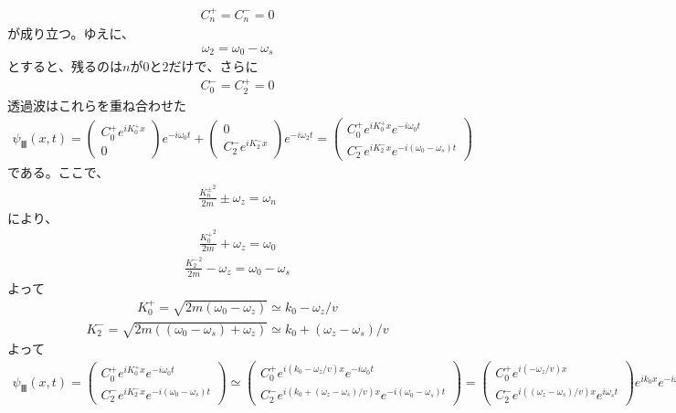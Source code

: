 \begin{align}
C_{n}^{+}=C_{n}^{-}=0
\end{align}
が成り立つ。ゆえに、
\begin{align}
\omega_{2}=\omega_{0}-\omega_{s}
\end{align}
$とすると、残るのはnが0と2だけで、さらに$
\begin{align}
C_{0}^{-}=C_{2}^{+}=0
\end{align}
透過波はこれらを重ね合わせた
\begin{align}
{\psi}_{Ⅲ}(x,t)=
\begin{pmatrix}
C_{0}^{+}e^{iK_{0}^{+}x} \\
0
\end{pmatrix}
e^{-i\omega_{0}t}+
\begin{pmatrix}
0 \\
C_{2}^{-}e^{iK_{2}^{-}x}
\end{pmatrix}
e^{-i\omega_{2}t}
=\begin{pmatrix}
C_{0}^{+}e^{iK_{0}^{+}x}e^{-i\omega_{0}t} \\
C_{2}^{-}e^{iK_{2}^{-}x}e^{-i(\omega_{0}-\omega_{s})t}
\end{pmatrix}
\end{align}
である。ここで、
\begin{align}
\frac{{K_{n}^{\pm}}^2}{2m}{\pm}\omega_{z}=\omega_{n}
\end{align}
により、
\begin{align}
\frac{{K_{0}^{+}}^2}{2m}+\omega_{z}=\omega_{0}
\end{align}
\begin{align}
\frac{{K_{2}^{-}}^2}{2m}-\omega_{z}=\omega_{0}-\omega_{s}
\end{align}
よって
\begin{align}
K_{0}^{+}=\sqrt{2m(\omega_{0}-\omega_{z})}{\simeq}k_{0}-\omega_{z}/v
\end{align}
\begin{align}
K_{2}^{-}=\sqrt{2m((\omega_{0}-\omega_{s})+\omega_{z})}{\simeq}k_{0}+(\omega_{z}-\omega_{s})/v
\end{align}
よって
\begin{align}
{\psi}_{Ⅲ}(x,t)=
\begin{pmatrix}
C_{0}^{+}e^{iK_{0}^{+}x}e^{-i\omega_{0}t} \\
C_{2}^{-}e^{iK_{2}^{-}x}e^{-i(\omega_{0}-\omega_{s})t}
\end{pmatrix}
{\simeq}
\begin{pmatrix}
C_{0}^{+}e^{i(k_{0}-\omega_{z}/v)x}e^{-i\omega_{0}t} \\
C_{2}^{-}e^{i(k_{0}+(\omega_{z}-\omega_{s})/v)x}e^{-i(\omega_{0}-\omega_{s})t}
\end{pmatrix}=
\begin{pmatrix}
C_{0}^{+}e^{i(-\omega_{z}/v)x} \\
C_{2}^{-}e^{i((\omega_{z}-\omega_{s})/v)x}e^{i\omega_{s}t}
\end{pmatrix}
e^{ik_{0}x}e^{-i\omega_{0}t}
\end{align}
